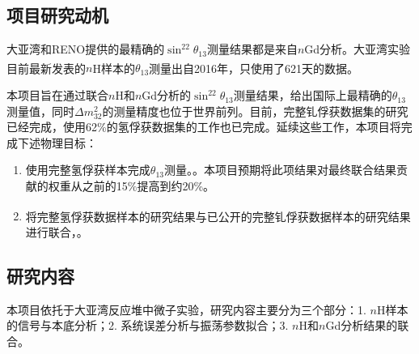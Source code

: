 \documentclass[a4paper,zihao=-4]{article}
\newcommand{\citess}[1]{\textsuperscript{\cite{#1}}}
\begin{document}
\subsection{项目研究动机}
大亚湾和RENO提供的最精确的$\sin^22\theta_{13}$测量结果都是来自$n$Gd分析。大亚湾实验目前最新发表的$n$H样本的$\theta_{13}$测量\citess{DayaBay:2016ziq}出自2016年，只使用了621天的数据。

本项目旨在通过联合$n$H和$n$Gd分析的$\sin^22\theta_{13}$测量结果，给出国际上最精确的$\theta_{13}$测量值，同时$\Delta m_{32}^2$的测量精度也位于世界前列。目前，完整钆俘获数据集的研究已经完成，使用62\%的氢俘获数据集的工作也已完成。延续这些工作，本项目将完成下述物理目标：
\begin{enumerate}
	\item 使用完整氢俘获样本完成$\theta_{13}$测量。。本项目预期将此项结果对最终联合结果贡献的权重从之前的15\%提高到约20\%。
	\item 将完整氢俘获数据样本的研究结果与已公开的完整钆俘获数据样本的研究结果\citess{DayaBay:2022orm}进行联合，。
\end{enumerate}

\begin{spacing}{1.3} %
	 \songti   
	
	  
	\vspace{11bp}
\end{spacing}

\subsection{研究内容}

本项目依托于大亚湾反应堆中微子实验，研究内容主要分为三个部分：1. $n$H样本的信号与本底分析；2. 系统误差分析与振荡参数拟合；3. $n$H和$n$Gd分析结果的联合。
\end{document}
